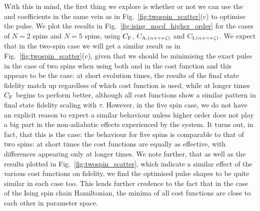 With this in mind, the first thing we explore is whether or not we can use the  and   coefficients in the same vein as in Fig.~\ref{fig:twospin_scatter}(c) to optimise the  pulse. We plot the results in Fig.~\ref{fig:ising_nocd_higher_order} for the cases of $N=2$ spins and $N=5$ spins, using $C_{\rm F}$, $C_{\rm A, (\alpha + \gamma +\zeta)}$ and $C_{\rm I, (\alpha + \gamma +\zeta)}$. We expect that in the two-spin case we will get a similar result as in Fig.~\ref{fig:twospin_scatter}(c), given that we should be minimising the exact  pulse in the case of two spins when using both  and  in the cost function and this appears to be the case: at short evolution times, the results of the final state fidelity match up regardless of which cost function is used, while at longer times $C_{\rm F}$ begins to perform better, although all cost functions show a similar pattern in final state fidelity scaling with $\tau$. However, in the five spin case, we do not have an explicit reason to expect a similar behaviour unless higher order  does not play a big part in the non-adiabatic effects experienced by the system. It turns out, in fact, that this is the case: the behaviour for five spins is comparable to that of two spins: at short times the cost functions are equally as effective, with differences appearing only at longer times. We note further, that as well as the results plotted in Fig.~\ref{fig:twospin_scatter}, which indicate a similar effect of the various cost functions on fidelity, we find the optimised pulse shapes to be quite similar in each case too. This lends further credence to the fact that in the case of the Ising spin chain Hamiltonian, the minima of all cost functions are close to each other in parameter space.

